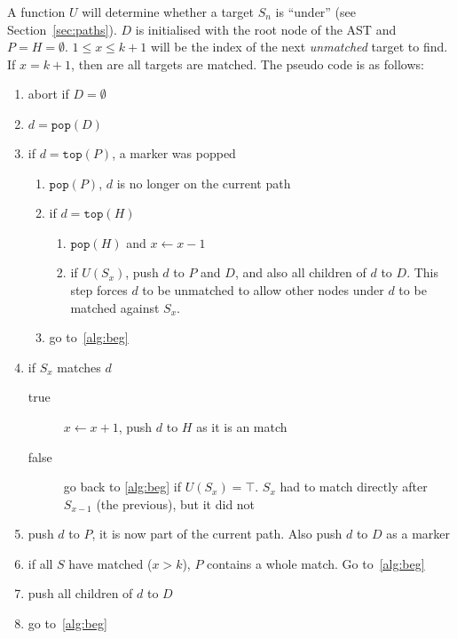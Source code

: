 \documentclass[a4paper,12pt]{article}
\begin{document}
A function $U$
will determine whether a target $S_n$ is ``under'' (see Section~\ref{sec:paths}). $D$ is
initialised with the root node of the AST and $P = H = \emptyset$. $1 \leq x \leq k+1$ will be the index of
the next \emph{unmatched} target to find. If $x = k+1$, then are all targets are matched.
The pseudo code is as follows:

\begin{enumerate}[noitemsep]
  \item\label{alg:beg} abort if $D = \emptyset$
  \item $d = \mathtt{pop}(D)$
  \item if $d = \mathtt{top}(P)$, a marker was popped
    \begin{enumerate}
      \item $\mathtt{pop}(P)$, $d$ is no longer on the current path
      \item if $d = \mathtt{top}(H)$
      \begin{enumerate}
        \item $\mathtt{pop}(H)$ and $x \gets x-1$
        \item if $U(S_x)$, push $d$ to $P$ and $D$, and also all children of $d$ to $D$.
        This step forces $d$ to be unmatched to allow other nodes under $d$ to
        be matched against $S_x$.
      \end{enumerate}
      \item go to~\ref{alg:beg}
    \end{enumerate}
  \item if $S_x$ matches $d$
    \begin{description}
      \item[true] $x \gets x+1$, push $d$ to $H$ as it is an match
      \item[false] go back to \ref{alg:beg} if $U(S_x) = \top$. $S_x$ had to match
      directly after $S_{x-1}$ (the previous), but it did not
    \end{description}
  \item push $d$ to $P$, it is now part of the current path. Also push $d$ to $D$ as a marker
  \item if all $S$ have matched ($x > k$), $P$ contains a whole match. Go to~\ref{alg:beg}
  \item push all children of $d$ to $D$
  \item go to~\ref{alg:beg}
\end{enumerate}
\end{document}
